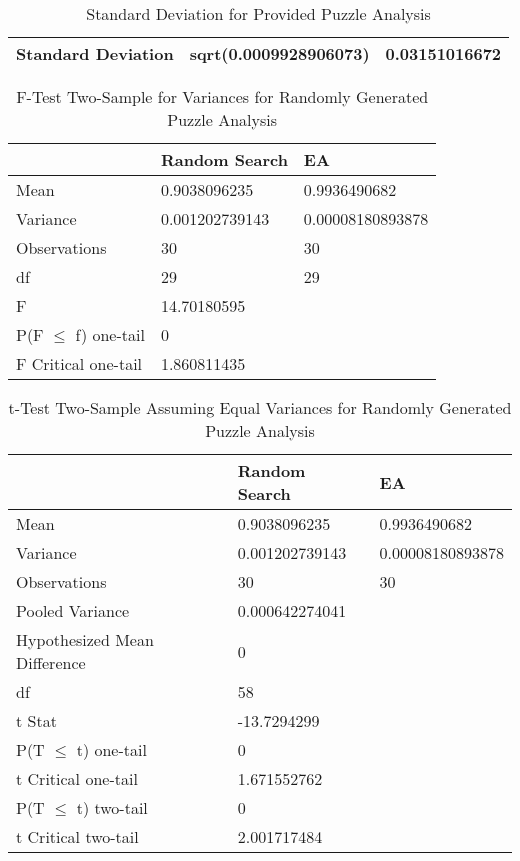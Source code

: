 \documentclass[11pt]{article}
\begin{document}
\begin{table}[H]
\centering
\caption{Standard Deviation for Provided Puzzle Analysis}
\label{my-label}
\begin{tabular}{|l|l|l|}
\hline
Standard Deviation & sqrt(0.0009928906073) & 0.03151016672 \\ \hline
\end{tabular}
\end{table}


\begin{table}[H]
\centering
\caption{F-Test Two-Sample for Variances for Randomly Generated Puzzle Analysis}
\label{my-label}
\begin{tabular}{l|l|l}
 & Random Search & EA \\ \hline
Mean & 0.9038096235 & 0.9936490682 \\
Variance & 0.001202739143 & 0.00008180893878 \\
Observations & 30 & 30 \\
df & 29 & 29 \\
F & 14.70180595 &  \\
P(F $\leq$ f) one-tail & 0 &  \\
F Critical one-tail & 1.860811435 & 
\end{tabular}
\end{table}

\begin{table}[H]
\centering
\caption{t-Test Two-Sample Assuming Equal Variances for Randomly Generated Puzzle Analysis}
\label{my-label}
\begin{tabular}{l|l|l}
 & Random Search & EA \\ \hline
Mean & 0.9038096235 & 0.9936490682 \\
Variance & 0.001202739143 & 0.00008180893878 \\
Observations & 30 & 30 \\
Pooled Variance & 0.000642274041 &  \\
Hypothesized Mean Difference & 0 &  \\
df & 58 &  \\
t Stat & -13.7294299 &  \\
P(T $\leq$ t) one-tail & 0 &  \\
t Critical one-tail & 1.671552762 &  \\
P(T $\leq$ t) two-tail & 0 &  \\
t Critical two-tail & 2.001717484 &
\end{tabular}
\end{table}
\end{document}
